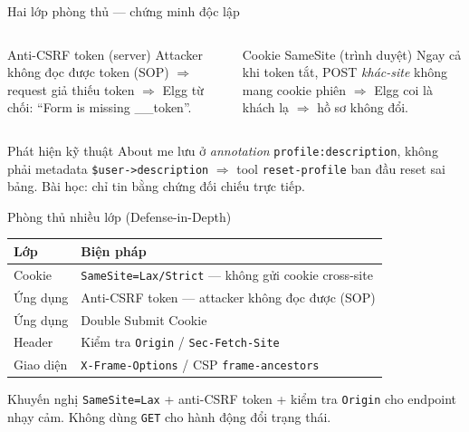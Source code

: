 \documentclass[11pt,aspectratio=169]{beamer}
\begin{document}
\begin{frame}{Hai lớp phòng thủ — chứng minh độc lập}
  \footnotesize
  \begin{columns}[t]
      \begin{block}{Anti-CSRF token (server)}
        \scriptsize Attacker không đọc được token (SOP) $\Rightarrow$ request giả thiếu token $\Rightarrow$ Elgg từ chối: \alert{``Form is missing \_\_token''}.
      \end{block}
      \begin{block}{Cookie SameSite (trình duyệt)}
        \scriptsize Ngay cả khi token tắt, POST \emph{khác-site} không mang cookie phiên $\Rightarrow$ Elgg coi là khách lạ $\Rightarrow$ hồ sơ không đổi.
      \end{block}
  \end{columns}
  \vfill
  \begin{alertblock}{Phát hiện kỹ thuật}
    \scriptsize About me lưu ở \emph{annotation} \texttt{profile:description}, không phải metadata \texttt{\$user->description} $\Rightarrow$ tool \texttt{reset-profile} ban đầu reset sai bảng. Bài học: chỉ tin bằng chứng đối chiếu trực tiếp.
  \end{alertblock}
\end{frame}

\begin{frame}{Phòng thủ nhiều lớp (Defense-in-Depth)}
  \footnotesize
  \begin{tabular}{ll}
    \toprule
    \textbf{Lớp} & \textbf{Biện pháp}\\
    \midrule
    Cookie & \texttt{SameSite=Lax/Strict} — không gửi cookie cross-site\\
    Ứng dụng & Anti-CSRF token — attacker không đọc được (SOP)\\
    Ứng dụng & Double Submit Cookie\\
    Header & Kiểm tra \texttt{Origin} / \texttt{Sec-Fetch-Site}\\
    Giao diện & \texttt{X-Frame-Options} / CSP \texttt{frame-ancestors}\\
    \bottomrule
  \end{tabular}
  \medskip
  \begin{block}{Khuyến nghị}
    \footnotesize \texttt{SameSite=Lax} + anti-CSRF token + kiểm tra \texttt{Origin} cho endpoint nhạy cảm. Không dùng \texttt{GET} cho hành động đổi trạng thái.
  \end{block}
\end{frame}
\end{document}
